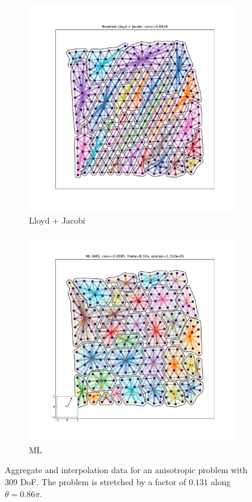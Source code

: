 \documentclass{article}
\begin{document}
\begin{figure}[h]
\begin{subfigure}[t]{0.32\textwidth}
    \includegraphics[width=\textwidth, trim=80 70 70 50, clip]{grid_anis_4_lloyd.pdf}
    \caption{Lloyd + Jacobi}
  \end{subfigure}
  \begin{subfigure}[t]{0.32\textwidth}
    \centering
    \includegraphics[width=\textwidth, trim=80 70 70 50, clip]{grid_anis_4_ml.pdf}
    \caption{ML}
  \end{subfigure}
  \caption{Aggregate and interpolation data for an anisotropic problem with 309 DoF.  The problem is stretched by a factor of $0.131$ along $\theta=0.86\pi$.}
  \label{fig:grid_anis_4}
\end{figure}
\end{document}
